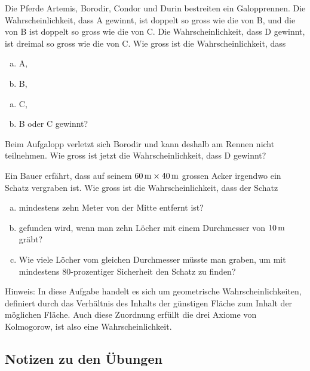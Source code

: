 \documentclass[%
11pt,%
twoside,%
titlepage,%
german,%
headsepline%
]{scrartcl}
\newcommand{\faEyeLightGray}{\textcolor{lightgray}{\faEye}} %
\newcommand{\concatueb}[1]{ueb:#1}%
\newcommand{\concatlsg}[1]{lsg:#1}%
\newcommand{\uebh}[2]{%
  \begin{ueb}\label{\concatueb{#1}} %
    #2
    \hfill\hyperref[\concatlsg{#1}]{\faEyeLightGray}
  \end{ueb}%
}
\begin{document}
\uebh{pferderennen}{
Die Pferde Artemis, Borodir, Condor und Durin bestreiten ein Galopprennen. Die Wahrscheinlichkeit, dass A gewinnt, ist doppelt so gross wie die von B, und die von B ist doppelt so gross wie die von C. Die Wahrscheinlichkeit, dass D gewinnt, ist dreimal so gross wie die von C. Wie gross ist die Wahrscheinlichkeit, dass

\begin{minipage}{3.8cm}
\begin{enumerate}[a)]
\item A,
\item B,
\end{enumerate}
\end{minipage}
\begin{minipage}{3.9cm}
\begin{enumerate}[a)]
\addtocounter{enumi}{2}
\item C,
\item B oder C gewinnt?
\end{enumerate}
\end{minipage}

Beim Aufgalopp verletzt sich Borodir und kann deshalb am Rennen nicht teilnehmen. Wie gross
ist jetzt die Wahrscheinlichkeit, dass D gewinnt?
}

\uebh{bauersucht}{
Ein Bauer erfährt, dass auf seinem $\unit[60]{m} \times \unit[40]{m}$ grossen Acker irgendwo ein Schatz vergraben ist. Wie gross ist die Wahrscheinlichkeit, dass der Schatz

\begin{enumerate}[a)]
\item mindestens zehn Meter von der Mitte entfernt ist?
\item gefunden wird, wenn man zehn Löcher mit einem
Durchmesser von $\unit[10]{m}$ gräbt?
\item Wie viele Löcher vom gleichen Durchmesser müsste man graben, um mit mindestens $80$-prozentiger Sicherheit den Schatz zu finden?
\end{enumerate}

Hinweis: In diese Aufgabe handelt es sich um geometrische Wahrscheinlichkeiten, definiert durch das Verhältnis des Inhalts der günstigen Fläche zum Inhalt der möglichen Fläche. Auch diese Zuordnung erfüllt die drei Axiome von Kolmogorow, ist also eine Wahrscheinlichkeit.
}

\clearpage

\subsection{Notizen zu den \"Ubungen}
\end{document}
